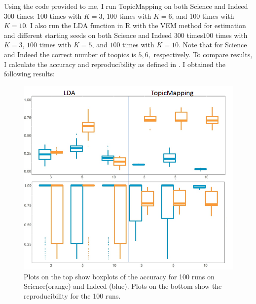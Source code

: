 \documentclass[12pt]{article}
\begin{document}
Using the code provided to me, I run TopicMapping on both Science and Indeed $300$ times:  $100$ times with $K=3$, $100$ times with $K=6$, and $100$ times with $K=10$. I also run the LDA function in R with the VEM method for estimation and different starting seeds on both Science and Indeed $300$ times$100$ times with $K=3$, $100$ times with $K=5$, and $100$ times with $K=10$. Note that for Science and Indeed the correct number of toopics is $5, 6,$ respectively. To compare results, I calculate the accuracy and reproducibility as defined in \cite{mainExtra}. I obtained the following results: 
\vspace{2mm}
\begin{figure}[H]
	\centering
	\includegraphics[scale=0.5]{Images/results.png}
	\caption{Plots on the top show boxplots of the accuracy for 100 runs on Science(orange) and Indeed (blue). Plots on the bottom show the reproducibility for the 100 runs.}
\end{figure}
\vspace{2mm} 
\end{document}
